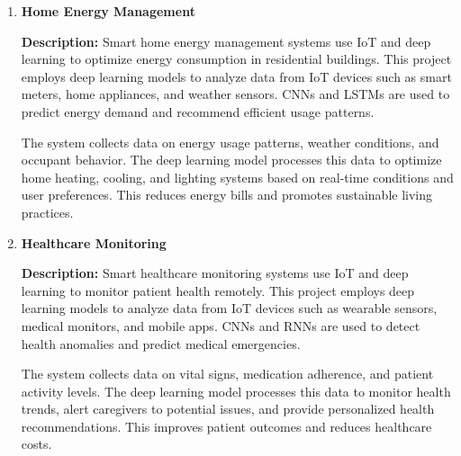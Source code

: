 \documentclass{article}
\begin{document}
\begin{enumerate}[label=\textbf{\arabic*.}, leftmargin=*]


\vspace{24pt} %
\item \textbf{Home Energy Management}

\textbf{Description:}
Smart home energy management systems use IoT and deep learning to optimize energy consumption in residential buildings. This project employs deep learning models to analyze data from IoT devices such as smart meters, home appliances, and weather sensors. CNNs and LSTMs are used to predict energy demand and recommend efficient usage patterns.

The system collects data on energy usage patterns, weather conditions, and occupant behavior. The deep learning model processes this data to optimize home heating, cooling, and lighting systems based on real-time conditions and user preferences. This reduces energy bills and promotes sustainable living practices.



\vspace{24pt} %
\item \textbf{Healthcare Monitoring}

\textbf{Description:}
Smart healthcare monitoring systems use IoT and deep learning to monitor patient health remotely. This project employs deep learning models to analyze data from IoT devices such as wearable sensors, medical monitors, and mobile apps. CNNs and RNNs are used to detect health anomalies and predict medical emergencies.

The system collects data on vital signs, medication adherence, and patient activity levels. The deep learning model processes this data to monitor health trends, alert caregivers to potential issues, and provide personalized health recommendations. This improves patient outcomes and reduces healthcare costs.



\end{enumerate}
\end{document}
